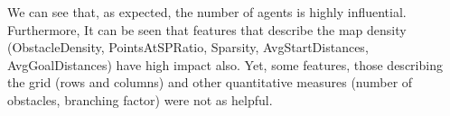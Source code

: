 We can see that, as expected, the number of agents is highly influential. 
Furthermore, It can be seen that features that describe the map density (ObstacleDensity, PointsAtSPRatio, Sparsity, AvgStartDistances, AvgGoalDistances) have high impact also. 
Yet, some features, those describing the grid (rows and columns) and other quantitative measures (number of obstacles, branching factor) were not as helpful.






\begin{center}
\begin{table}[t]
\centering
{}
\caption{Results for all models across all the test set.}
\label{table:allResults}
\end{table}
\end{center}





